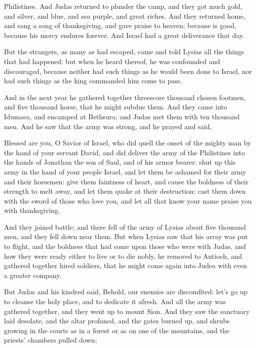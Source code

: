 { Philistines.
And Judas returned to plunder the camp, and they got much gold, and silver, and blue, and sea purple, and great riches.
And they returned home, and sang a song of thanksgiving, and gave praise
 to heaven; because
{} is good, because his mercy endures forever.
And Israel had a great deliverance that day.
\par }{\PP {}But the strangers, as many as had escaped, came and told Lysias all the things that had happened:
but when he heard thereof, he was confounded and discouraged, because neither had such things as he would been done to Israel, nor had such things as the king commanded him come to pass.
\par }{\PP {}And in the next year he gathered together threescore thousand chosen footmen, and five thousand horse, that he might subdue them.
And they came into Idumaea, and encamped at Bethsura; and Judas met them with ten thousand men.
And he saw that the army was strong, and he prayed and said,
\par }{\PP Blessed are you, O Savior of Israel, who did quell the onset of the mighty man by the hand of your servant David, and did deliver the army of the
 Philistines into the hands of Jonathan the son of Saul, and of his armor bearer:
shut up this army in the hand of your people Israel, and let them be ashamed for their army and their horsemen:
give them faintness of heart, and cause the boldness of their strength to melt away, and let them quake at their destruction:
cast them down with the sword of those who love you, and let all that know your name praise you with thanksgiving.
\par }{\PP {}And they joined battle; and there fell of the army of Lysias about five thousand men, and they fell down near them.
But when Lysias saw that his array was put to flight, and the boldness that had come upon those who were with Judas, and how they were ready either to live or to die nobly, he removed to Antioch, and gathered together hired soldiers, that he might come again into Judea with even a greater company.
\par }{\PP {}But Judas and his kindred said, Behold, our enemies are discomfited: let’s go up to cleanse the holy place, and to dedicate it afresh.
And all the army was gathered together, and they went up to mount Sion.
And they saw the sanctuary laid desolate, and the altar profaned, and the gates burned up, and shrubs growing in the courts as in a forest or as on one of the mountains, and the priests’ chambers pulled down;
}
